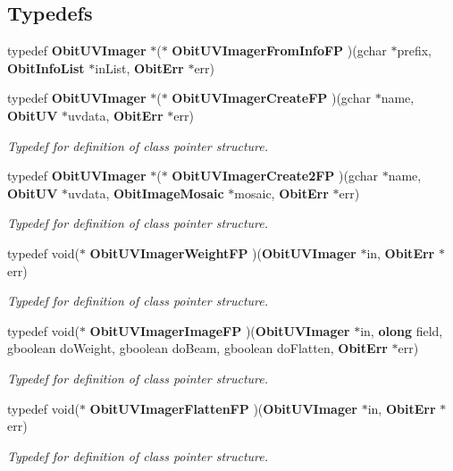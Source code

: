 \subsection*{Typedefs}
\begin{CompactItemize}
\item 
typedef {\bf Obit\-UVImager} $\ast$($\ast$ {\bf Obit\-UVImager\-From\-Info\-FP} )(gchar $\ast$prefix, {\bf Obit\-Info\-List} $\ast$in\-List, {\bf Obit\-Err} $\ast$err)
\item 
typedef {\bf Obit\-UVImager} $\ast$($\ast$ {\bf Obit\-UVImager\-Create\-FP} )(gchar $\ast$name, {\bf Obit\-UV} $\ast$uvdata, {\bf Obit\-Err} $\ast$err)
\begin{CompactList}\small\item\em Typedef for definition of class pointer structure. \item\end{CompactList}\item 
typedef {\bf Obit\-UVImager} $\ast$($\ast$ {\bf Obit\-UVImager\-Create2FP} )(gchar $\ast$name, {\bf Obit\-UV} $\ast$uvdata, {\bf Obit\-Image\-Mosaic} $\ast$mosaic, {\bf Obit\-Err} $\ast$err)
\begin{CompactList}\small\item\em Typedef for definition of class pointer structure. \item\end{CompactList}\item 
typedef void($\ast$ {\bf Obit\-UVImager\-Weight\-FP} )({\bf Obit\-UVImager} $\ast$in, {\bf Obit\-Err} $\ast$err)
\begin{CompactList}\small\item\em Typedef for definition of class pointer structure. \item\end{CompactList}\item 
typedef void($\ast$ {\bf Obit\-UVImager\-Image\-FP} )({\bf Obit\-UVImager} $\ast$in, {\bf olong} field, gboolean do\-Weight, gboolean do\-Beam, gboolean do\-Flatten, {\bf Obit\-Err} $\ast$err)
\begin{CompactList}\small\item\em Typedef for definition of class pointer structure. \item\end{CompactList}\item 
typedef void($\ast$ {\bf Obit\-UVImager\-Flatten\-FP} )({\bf Obit\-UVImager} $\ast$in, {\bf Obit\-Err} $\ast$err)
\begin{CompactList}\small\item\em Typedef for definition of class pointer structure. \item\end{CompactList}\item 

\end{CompactItemize}
